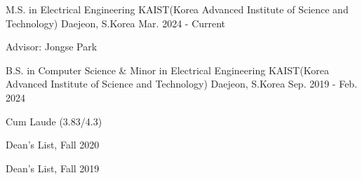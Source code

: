 \begin{cventries}

  \cventry
    {M.S. in Electrical Engineering} %
    {KAIST(Korea Advanced Institute of Science and Technology)} %
    {Daejeon, S.Korea} %
    {Mar. 2024 - Current} %
    {
      \begin{cvitems}
        \item {Advisor: Jongse Park}
      \end{cvitems}
    }

  \cventry
    {B.S. in Computer Science \& Minor in Electrical Engineering} %
    {KAIST(Korea Advanced Institute of Science and Technology)} %
    {Daejeon, S.Korea} %
    {Sep. 2019 - Feb. 2024} %
    {
      \begin{cvitems}
        \item {Cum Laude (3.83/4.3)}
        \item {Dean's List, Fall 2020}
        \item {Dean's List, Fall 2019}
      \end{cvitems}
    }

\end{cventries}
